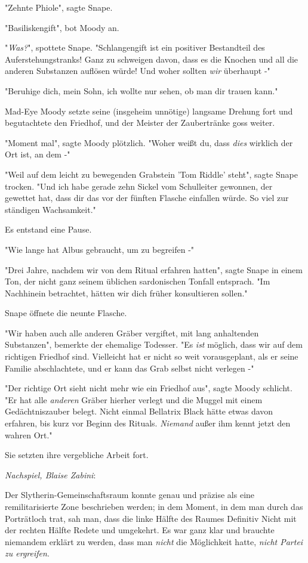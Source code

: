 {"Zehnte Phiole", sagte Snape.

"Basiliskengift", bot Moody an.

"\emph{Was?}", spottete Snape. "Schlangengift ist ein positiver Bestandteil des Auferstehungstranks! Ganz zu schweigen davon, dass es die Knochen und all die anderen Substanzen auflösen würde! Und woher sollten \emph{wir} überhaupt -"

"Beruhige dich, mein Sohn, ich wollte nur sehen, ob man dir trauen kann."

Mad-Eye Moody setzte seine (insgeheim unnötige) langsame Drehung fort und begutachtete den Friedhof, und der Meister der Zaubertränke goss weiter.

"Moment mal", sagte Moody plötzlich. "Woher weißt du, dass \emph{dies} wirklich der Ort ist, an dem -"

"Weil auf dem leicht zu bewegenden Grabstein 'Tom Riddle' steht", sagte Snape trocken. "Und ich habe gerade zehn Sickel vom Schulleiter gewonnen, der gewettet hat, dass dir das vor der fünften Flasche einfallen würde. So viel zur ständigen Wachsamkeit."

Es entstand eine Pause.

"Wie lange hat Albus gebraucht, um zu begreifen -"

"Drei Jahre, nachdem wir von dem Ritual erfahren hatten", sagte Snape in einem Ton, der nicht ganz seinem üblichen sardonischen Tonfall entsprach. "Im Nachhinein betrachtet, hätten wir dich früher konsultieren sollen."

Snape öffnete die neunte Flasche.

"Wir haben auch alle anderen Gräber vergiftet, mit lang anhaltenden Substanzen", bemerkte der ehemalige Todesser. "Es \emph{ist} möglich, dass wir auf dem richtigen Friedhof sind. Vielleicht hat er nicht so weit vorausgeplant, als er seine Familie abschlachtete, und er kann das Grab selbst nicht verlegen -"

"Der richtige Ort sieht nicht mehr wie ein Friedhof aus", sagte Moody schlicht. "Er hat alle \emph{anderen} Gräber hierher verlegt und die Muggel mit einem Gedächtniszauber belegt. Nicht einmal Bellatrix Black hätte etwas davon erfahren, bis kurz vor Beginn des Rituals. \emph{Niemand} außer ihm kennt jetzt den wahren Ort."

Sie setzten ihre vergebliche Arbeit fort.

\emph{Nachspiel, Blaise Zabini}:

Der Slytherin-Gemeinschaftsraum konnte genau und präzise als eine remilitarisierte Zone beschrieben werden; in dem Moment, in dem man durch das Porträtloch trat, sah man, dass die linke Hälfte des Raumes Definitiv Nicht mit der rechten Hälfte Redete und umgekehrt. Es war ganz klar und brauchte niemandem erklärt zu werden, dass man \emph{nicht} die Möglichkeit hatte, \emph{nicht Partei zu ergreifen}.

}
